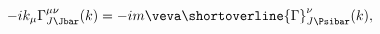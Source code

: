 \begin{equation*}
  -ik_\mu\Gamma_{J\smash[t]{\Jbar}}^{\mu\nu}(k)=-im\veva
  \shortoverline{\Gamma}_{J\smash[t]{\Psibar}}^\nu(k),
\end{equation*}

